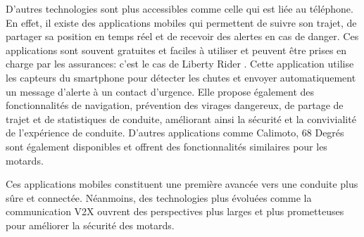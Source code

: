 D'autres technologies sont plus accessibles comme celle qui est liée au téléphone. En effet, il existe des applications mobiles qui permettent de suivre son trajet, de partager sa position en temps réel et de recevoir des alertes en cas de danger. Ces applications sont souvent gratuites et faciles à utiliser et peuvent être prises en charge par les assurances: c'est le cas de Liberty Rider \cite{liberty_rider}. Cette application utilise les capteurs du smartphone pour détecter les chutes et envoyer automatiquement un message d'alerte à un contact d’urgence. Elle propose également des fonctionnalités de navigation, prévention des virages dangereux, de partage de trajet et de statistiques de conduite, améliorant ainsi la sécurité et la convivialité de l’expérience de conduite. D'autres applications comme Calimoto, 68 Degrés sont également disponibles et offrent des fonctionnalités similaires pour les motards.
\vspace{0.5cm}

Ces applications mobiles constituent une première avancée vers une conduite plus sûre et connectée. Néanmoins, des technologies plus évoluées comme la communication V2X ouvrent des perspectives plus larges et plus prometteuses pour améliorer la sécurité des motards.
\vspace{0.5cm}

